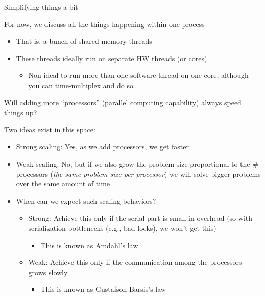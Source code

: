 \documentclass{beamer}
\begin{document}

\begin{frame}{Simplifying things a bit}

\noindent For now, we discuss all the things happening within
one process
\begin{itemize}
\item That is, a bunch of shared memory threads
\item These threads ideally run on separate HW threads (or cores)
  \begin{itemize}
  \item Non-ideal to run more than one software thread on one core,
    although you can time-multiplex and do so
  \end{itemize}
\end{itemize}
 
\end{frame}



\begin{frame}{Will adding more ``processors'' (parallel computing
capability) always speed things up?}

\noindent Two ideas exist in this space:
\begin{itemize}
\item Strong scaling: Yes, as we add processors, we get faster
\item Weak scaling: No, but if we also grow the problem size proportional
        to the \# processors
        ({\em the same problem-size per processor})
        we will solve bigger problems over
        the same amount of time 


\item When can we expect such scaling behaviors?
    \begin{itemize}
      \item Strong: Achieve this only if the serial part is small in overhead
        (so with serialization bottlenecks (e.g., bad locks),
          we won't get this)
          \begin{itemize}
          \item This is known as Amdahl's law
          \end{itemize}
      
      \item Weak: Achieve this only if the communication among the processors
          grows slowly
          \begin{itemize}
          \item This is known as Gustafson-Barsis's law
          \end{itemize}
    \end{itemize}

\end{itemize}
 
\end{frame}
\end{document}
